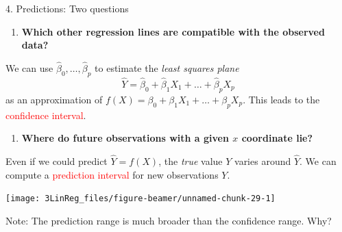 \documentclass[10pt,ignorenonframetext,]{beamer}
\providecommand{\tightlist}{%
  \setlength{\itemsep}{0pt}\setlength{\parskip}{0pt}}
\begin{document}
\begin{frame}

\begin{block}{4. Predictions: Two questions}

\begin{enumerate}
\def\labelenumi{\arabic{enumi}.}
\tightlist
\item
  \textbf{Which other regression lines are compatible with the observed
  data?}
\end{enumerate}

We can use \(\hat\beta_0, \ldots , \hat\beta_p\) to estimate the
\emph{least squares plane}
\[\hat{Y} = \hat\beta_0 + \hat\beta_1 X_1 + \ldots + \hat\beta_p X_p \]
as an approximation of
\(f(X) = \beta_0 + \beta_1 X_1 + \ldots + \beta_p X_p.\) This leads to
the \textcolor{red}{confidence interval}.

\vspace{4mm}

\begin{enumerate}
\def\labelenumi{\arabic{enumi}.}
\setcounter{enumi}{1}
\tightlist
\item
  \textbf{Where do future observations with a given \(x\) coordinate
  lie?}
\end{enumerate}

Even if we could predict \(\hat{Y}=f(X)\), the \emph{true} value \(Y\)
varies around \(\hat{Y}\). We can compute a
\textcolor{red}{prediction interval} for new observations \(Y\).

\end{block}

\end{frame}

\begin{frame}

\begin{center}\texttt{[image: 3LinReg\_files/figure-beamer/unnamed-chunk-29-1]} \end{center}

Note: The prediction range is much broader than the confidence range.
Why?

\end{frame}
\end{document}
